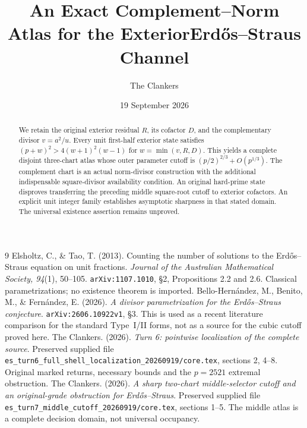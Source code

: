 \documentclass[11pt,reqno]{amsart}
\title{An Exact Complement--Norm Atlas for the Exterior\newline Erd\H{o}s--Straus Channel}
\author{The Clankers}\date{19 September 2026}
\begin{document}
\begin{abstract}
We retain the original exterior residual $R$, its cofactor $D$, and the
complementary divisor $v=a^2/u$. Every unit first-half exterior state satisfies
$(p+w)^2>4(w+1)^2(w-1)$ for $w=\min(v,R,D)$. This yields a complete disjoint
three-chart atlas whose outer parameter cutoff is
$(p/2)^{2/3}+O(p^{1/3})$. The complement chart is an actual norm-divisor
construction with the additional indispensable square-divisor availability
condition. An original hard-prime state disproves transferring the preceding
middle square-root cutoff to exterior cofactors. An explicit unit integer
family establishes asymptotic sharpness in that stated domain. The universal
existence assertion remains unproved.
\end{abstract}
\maketitle
\begin{thebibliography}{9}
 Elsholtz, C., \& Tao, T. (2013). Counting the number of solutions to the
Erd\H{o}s--Straus equation on unit fractions. \emph{Journal of the Australian
Mathematical Society, 94}(1), 50--105. \texttt{arXiv:1107.1010}, \S2,
Propositions 2.2 and 2.6. Classical parametrizations; no existence theorem is
imported.
 Bello-Hern\'andez, M., Benito, M., \& Fern\'andez, E. (2026).
\emph{A divisor parametrization for the Erd\H{o}s--Straus conjecture}.
\texttt{arXiv:2606.10922v1}, \S3. This is used as a recent literature
comparison for the standard Type~I/II forms, not as a source for the cubic
cutoff proved here.
 The Clankers. (2026). \emph{Turn 6: pointwise localization
of the complete source}. Preserved supplied file
\texttt{es\_turn6\_full\_shell\_localization\_20260919/core.tex}, sections 2,
4--8. Original marked returns, necessary bounds and the $p=2521$ extremal
obstruction.
 The Clankers. (2026). \emph{A sharp two-chart middle-selector
cutoff and an original-grade obstruction for Erd\H{o}s--Straus}. Preserved supplied
file \texttt{es\_turn7\_middle\_cutoff\_20260919/core.tex}, sections 1--5.
The middle atlas is a complete decision domain, not universal occupancy.
\end{thebibliography}
\end{document}
